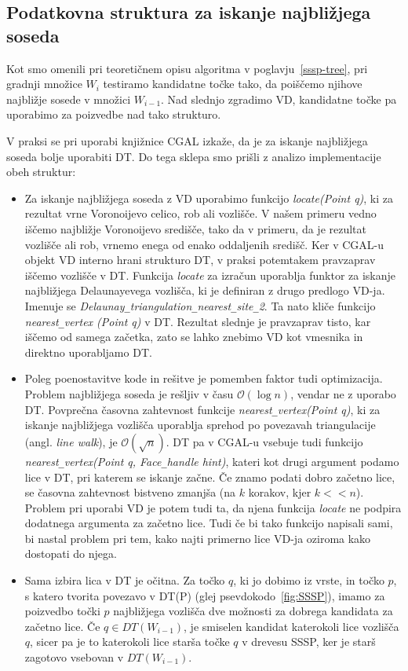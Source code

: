 \documentclass[a4paper, 12pt]{book}
\newcommand{\OO}{\ensuremath{\mathcal{O}}} %
\newcommand{\U}{\texttt{\_}}
\begin{document}
\subsection{Podatkovna struktura za iskanje najbližjega soseda}
\label{why dt}

Kot smo omenili pri teoretičnem opisu algoritma v poglavju~\ref{sssp-tree}, pri gradnji množice $W_i$ testiramo kandidatne točke tako, da poiščemo njihove najbližje sosede v množici $W_{i-1}$. Nad slednjo zgradimo VD, kandidatne točke pa uporabimo za poizvedbe nad tako strukturo.

V praksi se pri uporabi knjižnice CGAL izkaže, da je za iskanje najbližjega soseda bolje uporabiti DT. Do tega sklepa smo prišli z analizo implementacije obeh struktur:

\begin{itemize}
\item Za iskanje najbližjega soseda z VD uporabimo funkcijo \textit{locate(Point q)}, ki za rezultat vrne Voronoijevo celico, rob ali vozlišče. V našem primeru vedno iščemo najbližje Voronoijevo središče, tako da v primeru, da je rezultat vozlišče ali rob, vrnemo enega od enako oddaljenih središč. Ker v CGAL-u objekt VD interno hrani strukturo DT, v praksi potemtakem pravzaprav iščemo vozlišče v DT. Funkcija \textit{locate} za izračun uporablja funktor za iskanje najbližjega Delaunayevega vozlišča, ki je definiran z drugo predlogo VD-ja. Imenuje se \textit{Delaunay\U triangulation\U nearest\U site\U 2}. Ta nato kliče funkcijo \textit{nearest\U vertex (Point q)} v DT. Rezultat slednje je pravzaprav tisto, kar iščemo od samega začetka, zato se lahko znebimo VD kot vmesnika in direktno uporabljamo DT. 
\item Poleg poenostavitve kode in rešitve je pomemben faktor tudi optimizacija. Problem najbližjega soseda je rešljiv v času $\OO(\log n)$, vendar ne z uporabo DT. Povprečna časovna zahtevnost funkcije \textit{nearest\U vertex(Point q)}, ki za iskanje najbližjega vozlišča uporablja sprehod po povezavah triangulacije (angl. \textit{line walk}), je $\OO(\sqrt{n})$. DT pa v CGAL-u vsebuje tudi funkcijo \textit{nearest\U vertex(Point q, Face\U handle hint)}, kateri kot drugi argument podamo lice v DT, pri katerem se iskanje začne. Če znamo podati dobro začetno lice, se časovna zahtevnost bistveno zmanjša (na $k$ korakov, kjer $k << n$). Problem pri uporabi VD je potem tudi ta, da njena funkcija \textit{locate} ne podpira dodatnega argumenta za začetno lice. Tudi če bi tako funkcijo napisali sami, bi nastal problem pri tem, kako najti primerno lice VD-ja oziroma kako dostopati do njega. 
\item Sama izbira lica v DT je očitna. Za točko $q$, ki jo dobimo iz vrste, in točko $p$, s katero tvorita povezavo v DT(P) (glej psevdokodo~\ref{fig:SSSP}), imamo za poizvedbo točki $p$ najbližjega vozlišča dve možnosti za dobrega kandidata za začetno lice. Če $q\in DT(W_{i-1})$, je smiselen kandidat katerokoli lice vozlišča $q$, sicer pa je to katerokoli lice starša točke $q$ v drevesu SSSP, ker je starš zagotovo vsebovan v $DT(W_{i-1})$. 
\end{itemize}
\end{document}
